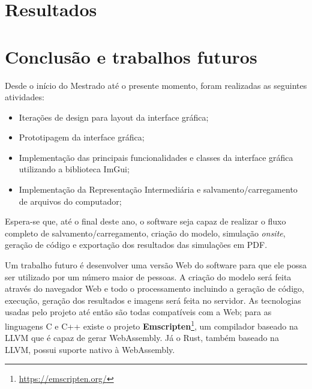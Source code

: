 \documentclass[
	12pt,				%
	openright,			%
	oneside,			%
	a4paper,			%
	main=brazil,
	english,			%
	]{ufsj-abntex2}
\begin{document}

\chapter{Resultados}
\label{chap:resultados}

\chapter{Conclusão e trabalhos futuros}
\label{chap:conclusao}

Desde o início do Mestrado até o presente momento, foram realizadas as seguintes atividades: 
\begin{itemize}
    \item Iterações de design para layout da interface gráfica;
    \item Prototipagem da interface gráfica;
    \item Implementação das principais funcionalidades e classes da interface gráfica utilizando a biblioteca ImGui;
    \item Implementação da Representação Intermediária e salvamento/carregamento de arquivos do computador;
\end{itemize}

Espera-se que, até o final deste ano, o software seja capaz de realizar o fluxo completo de salvamento/carregamento, criação do modelo, simulação \textit{onsite}, geração de código e exportação dos resultados das simulações em PDF.

Um trabalho futuro é desenvolver uma versão Web do software para que ele possa ser utilizado por um número maior de pessoas. A criação do modelo será feita através do navegador Web e todo o processamento incluindo a geração de código, execução, geração dos resultados e imagens será feita no servidor. As tecnologias usadas pelo projeto até então são todas compatíveis com a Web; para as linguagens C e C++ existe o projeto \textbf{Emscripten}\footnote{\href{https://emscripten.org/}{https://emscripten.org/}}, um compilador baseado na LLVM que é capaz de gerar WebAssembly. Já o Rust, também baseado na LLVM, possui suporte nativo à WebAssembly.
\end{document}
